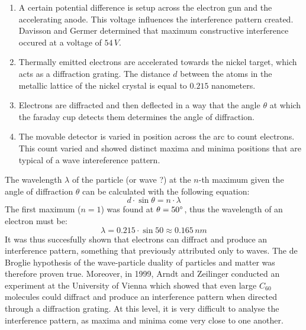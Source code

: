 \begin{enumerate}

	\item A certain potential difference is setup across the electron gun and the accelerating anode. This voltage influences the interference pattern created. Davisson and Germer determined that maximum constructive interference occured at a voltage of $54\, V$.

	\item Thermally emitted electrons are accelerated towards the nickel target, which acts as a diffraction grating. The distance $d$ between the atoms in the metallic lattice of the nickel crystal is equal to $0.215$ nanometers.

	\item Electrons are diffracted and then deflected in a way that the angle $\theta$ at which the faraday cup detects them determines the angle of diffraction.

	\item The movable detector is varied in position across the arc to count electrons. This count varied and showed distinct maxima and minima positions that are typical of a wave intereference pattern.

\end{enumerate}

The wavelength $\lambda$ of the particle (or wave ?) at the $n$-th maximum given the angle of diffraction $\theta$ can be calculated with the following equation: $$d \cdot \sin \theta = n \cdot \lambda$$ The first maximum ($n = 1$) was found at $\theta = 50\degree$, thus the wavelength of an electron must be: $$\lambda = 0.215 \cdot \sin 50 \approx 0.165\, nm$$ It was thus succesfully shown that electrons can diffract and produce an interference pattern, something that previously attributed only to waves. The de Broglie hypothesis of the wave-particle duality of particles and matter was therefore proven true. Moreover, in 1999, Arndt and Zeilinger conducted an experiment at the University of Vienna which showed that even large $C_{60}$ molecules could diffract and produce an interference pattern when directed through a diffraction grating. At this level, it is very difficult to analyse the interference pattern, as maxima and minima come very close to one another.


